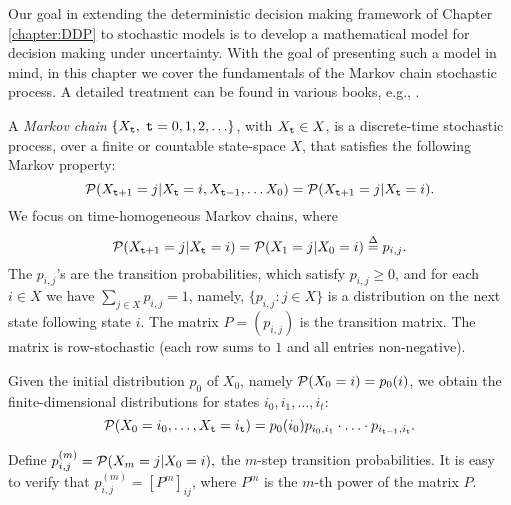 


Our goal in extending the deterministic decision making framework of Chapter \ref{chapter:DDP} to stochastic models is to develop a mathematical model for decision making under uncertainty. With the goal of presenting such a model in mind, in this chapter we cover the fundamentals of the Markov chain stochastic process. A detailed treatment can be found in various books, e.g., \citep{levin2017markov,puterman2014markov}.


A \emph{Markov chain} $\{ {X_{\tt t}},\;{\tt t} = 0,1,2, \ldots \} $, with
${X_{\tt t}} \in X$, is a discrete-time stochastic process, over a
finite or countable state-space $X$, that satisfies the following
Markov property:
    \[{\cal P}({X_{{\tt t} +1}} = j|{X_{\tt t}} = i,{X_{{\tt t} - 1}}, \ldots {X_0}) = {\cal P}({X_{{\tt t} +1}} = j|{X_{\tt t}} = i).\]
We focus on time-homogeneous Markov chains, where
\[{\cal P}({X_{\ttime +1}} = j|{X_\ttime} = i) = {\cal P}({X_1} = j|{X_0} = i) \buildrel \Delta \over = {p_{i,j}}.\]
The ${p_{i,j}}$'s  are the transition probabilities, which satisfy
$p_{i,j} \ge 0$, and for each $ i\in X$ we have $\sum_{j \in X}
{{p_{i,j}} = 1} $, namely, $\{p_{i,j}:j\in X\}$ is a distribution on
the next state following state $i$.  The matrix $P = ({p_{i,j}})$ is
the transition matrix. The matrix is row-stochastic (each row sums
to $1$ and all entries non-negative).

Given the initial distribution ${p_0}$ of ${X_0}$, namely ${\cal
P}({X_0} = i) = {p_0}(i)$, we obtain the finite-dimensional
distributions  for states $i_0,i_1,\ldots,i_t$:
\[{\cal P}({X_0} = {i_0}, \ldots ,{X_{\tt t}} = {i_{\tt t}}) = {p_0}(i_0){p_{{i_0},{i_1}}} \cdot  \ldots  \cdot {p_{{i_{{\tt t}- 1}},{i_{\tt t}}}}.\]

Define $p_{i,j}^{(m)} = {\cal P}({X_m} = j|{X_0} = i),$ the $m$-step
transition probabilities.  It is easy to verify that $p_{i,j}^{(m)}
= {[{P^m}]_{ij}}$, where ${P^m}$ is the $m$-th power of the matrix
$P$.

